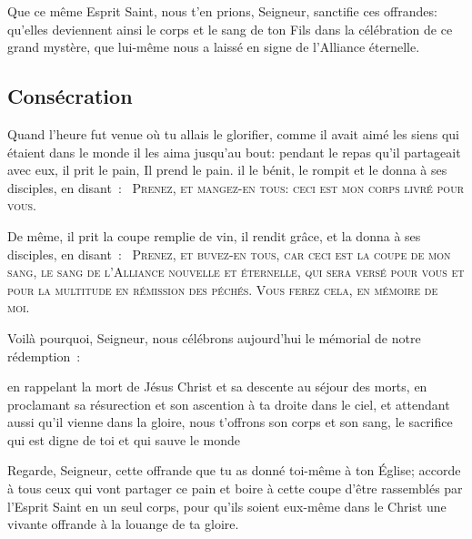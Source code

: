 
Que ce même Esprit Saint,
nous t'en prions, Seigneur,
sanctifie ces offrandes:
qu'elles deviennent ainsi 
le corps et le sang de ton Fils
dans la célébration de ce grand mystère,
que lui-même nous a laissé
en signe de l'Alliance éternelle.

\subsection{Consécration}

Quand l'heure fut venue où tu allais le glorifier,
comme il avait aimé les siens qui étaient dans le monde
il les aima jusqu'au bout:
pendant le repas qu'il partageait avec eux,
il prit le pain, Il prend le pain.
il le bénit,
le rompit
et le donna à ses disciples, en disant~: 
\textsc{\og~Prenez, et mangez-en tous:} 
\textsc{ceci est mon corps livré pour vous.~\fg} 



De même, il prit la coupe remplie de vin, 
il rendit grâce,
et la donna à ses disciples, en disant~: \textsc{\og~Prenez, et buvez-en tous,} 
\textsc{car ceci est la coupe de mon sang,
le sang de l'Alliance nouvelle et éternelle,
qui sera versé
pour vous et pour la multitude
en rémission des péchés.
Vous ferez cela,
en mémoire de moi.~\fg}





Voilà pourquoi, Seigneur,
nous célébrons aujourd'hui
le mémorial de notre rédemption~:

en rappelant la mort de Jésus Christ
et sa descente au séjour des morts,
en proclamant sa résurection
et son ascention à ta droite dans le ciel,
et attendant aussi
qu'il vienne dans la gloire,
nous t'offrons son corps et son sang,
le sacrifice qui est digne de toi
et qui sauve le monde

Regarde, Seigneur, cette offrande
que tu as donné toi-même à ton Église;
accorde à tous ceux qui vont partager ce pain
et boire à cette coupe
d'être rassemblés par l'Esprit Saint en un seul corps,
pour qu'ils soient eux-même dans le Christ
une vivante offrande
à la louange de ta gloire.

